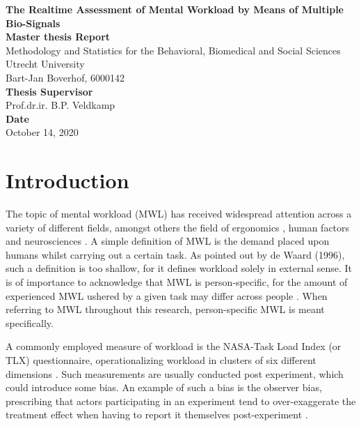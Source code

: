 \documentclass[12pt]{article}
\begin{document}
\begin{titlepage}
\begin{center}
\LARGE{\textbf{The Realtime Assessment of Mental Workload by Means of Multiple Bio-Signals}}\\
\vspace*{2\baselineskip}
\Large{\textbf{Master thesis Report}}\\
Methodology and Statistics for the Behavioral, Biomedical and Social Sciences\\
\vspace*{1\baselineskip}
Utrecht University\\
\vspace*{4\baselineskip}
{Bart-Jan Boverhof, 6000142}\\
\vspace*{1\baselineskip}
{\textbf{Thesis Supervisor}}\\
Prof.dr.ir. B.P. Veldkamp\\
\vspace*{1\baselineskip}
{\textbf{Date}}\\
October 14, 2020\\
\vspace*{1\baselineskip}
\end{center}
\end{titlepage}

\section{Introduction} \label{Introduction}
The topic of mental workload (MWL) has received widespread attention across a variety of different fields, amongst others the field of ergonomics \cite{young2015state}, human factors \cite{pretorius2007development} and neurosciences \cite{shuggi2017mental}.
A simple definition of MWL is the demand placed upon humans whilst carrying out a certain task. As pointed out by de Waard (1996), such a definition is too shallow, for it defines workload solely in external sense. It is of importance to acknowledge that MWL is person-specific, for the amount of experienced MWL ushered by a given task may differ across people \cite{de1996measurement}. When referring to MWL throughout this research, person-specific MWL is meant specifically.

A commonly employed measure of workload is the NASA-Task Load Index (or TLX) questionnaire, operationalizing workload in clusters of six different dimensions \cite{hart2006nasa}. Such measurements are usually conducted post experiment, which could introduce some bias. An example of such a bias is the observer bias, prescribing that actors participating in an experiment tend to over-exaggerate the treatment effect when having to report it themselves post-experiment \cite{mahtani2018catalogue}.
\end{document}
